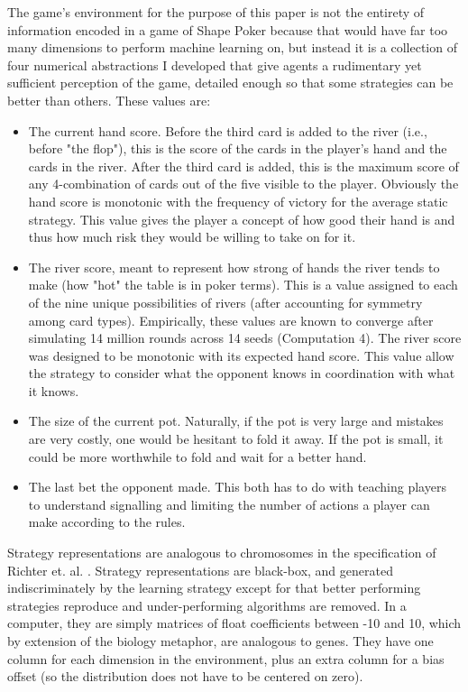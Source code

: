 \documentclass[11pt]{article}
\begin{document}
The game's environment for the purpose of this paper is not the entirety of information encoded in a game of Shape Poker because that would have far too many dimensions to perform machine learning on, but instead it is a collection of four numerical abstractions I developed that give agents a rudimentary yet sufficient perception of the game, detailed enough so that some strategies can be better than others. These values are:
\begin{itemize}
    \item The current hand score. Before the third card is added to the river (i.e., before "the flop"), this is the score of the cards in the player's hand and the cards in the river. After the third card is added, this is the maximum score of any 4-combination of cards out of the five visible to the player. Obviously the hand score is monotonic with the frequency of victory for the average static strategy. This value gives the player a concept of how good their hand is and thus how much risk they would be willing to take on for it.
    \item The river score, meant to represent how strong of hands the river tends to make (how "hot" the table is in poker terms). This is a value assigned to each of the nine unique possibilities of rivers (after accounting for symmetry among card types). Empirically, these values are known to converge after simulating 14 million rounds across 14 seeds (Computation 4). The river score was designed to be monotonic with its expected hand score. This value allow the strategy to consider what the opponent knows in coordination with what it knows.
    \item The size of the current pot. Naturally, if the pot is very large and mistakes are very costly, one would be hesitant to fold it away. If the pot is small, it could be more worthwhile to fold and wait for a better hand.
    \item The last bet the opponent made. This both has to do with teaching players to understand signalling and limiting the number of actions a player can make according to the rules.
\end{itemize}

Strategy representations are analogous to chromosomes in the specification of Richter et. al. \cite{Rich-Sheb-98}. Strategy representations are black-box, and generated indiscriminately by the learning strategy except for that better performing strategies reproduce and under-performing algorithms are removed. In a computer, they are simply matrices of float coefficients between -10 and 10, which by extension of the biology metaphor, are analogous to genes. They have one column for each dimension in the environment, plus an extra column for a bias offset (so the distribution does not have to be centered on zero).
\end{document}
